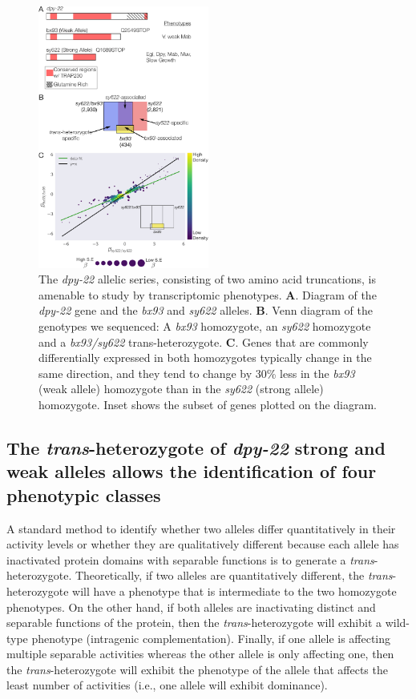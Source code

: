 \documentclass[10pt, onecolumn]{article}
\newcommand{\gene}[1]{\mbox{\emph{#1}}}
\begin{document}
\begin{figure}
  \centering{}
  \includegraphics[width=0.5\textwidth]{../figs/dpy22_allele_comparison.pdf}
  \caption{
    The \gene{dpy-22} allelic series, consisting of two amino acid truncations,
    is amenable to study by transcriptomic phenotypes. \textbf{A}. Diagram of
    the \gene{dpy-22} gene and the \emph{bx93} and \emph{sy622} alleles.
    \textbf{B}. Venn diagram of the genotypes we sequenced: A \emph{bx93}
    homozygote, an \emph{sy622} homozygote and a \emph{bx93/sy622}
    trans-heterozygote. \textbf{C}. Genes that are commonly differentially
    expressed in both homozygotes typically change in the same direction, and
    they tend to change by 30\% less in the \emph{bx93} (weak allele) homozygote
    than in the \emph{sy622} (strong allele) homozygote. Inset shows the subset
    of genes plotted on the diagram.
    }
\label{fig:dpy22}
\end{figure}


\subsection*{The \emph{trans}-heterozygote of \gene{dpy-22} strong and weak
             alleles allows the identification of four phenotypic classes}
\label{sec:transhet_analysis}
A standard method to identify whether two alleles differ quantitatively in their
activity levels or whether they are qualitatively different because each allele
has inactivated protein domains with separable functions is to generate a
\emph{trans}-heterozygote. Theoretically, if two alleles are quantitatively
different, the \emph{trans}-heterozygote will have a phenotype that is
intermediate to the two homozygote phenotypes. On the other hand, if both
alleles are inactivating distinct and separable functions of the protein, then
the \emph{trans}-heterozygote will exhibit a wild-type phenotype (intragenic
complementation). Finally, if one allele is affecting multiple separable
activities whereas the other allele is only affecting one, then the
\emph{trans}-heterozygote will exhibit the phenotype of the allele that affects
the least number of activities (i.e., one allele will exhibit dominance).
\end{document}
